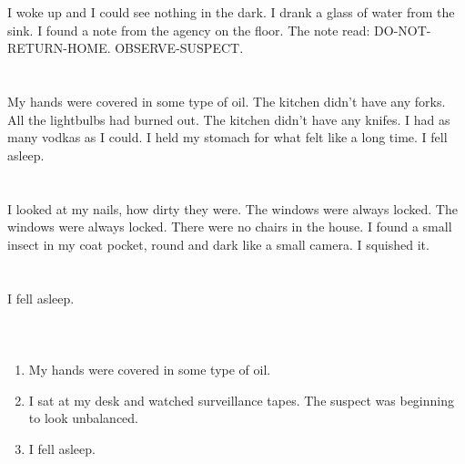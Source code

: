 \documentclass{article}
\begin{document}
    \section{}
    I woke up and I could see nothing in the dark. I drank a glass of water from the sink. I found a note from the agency on the floor. The note read: DO-NOT-RETURN-HOME. OBSERVE-SUSPECT.  
    \newpage
    
    \section{}
    My hands were covered in some type of oil. The kitchen didn't have any forks. All the lightbulbs had burned out. The kitchen didn't have any knifes. I had as many vodkas as I could. I held my stomach for what felt like a long time. I fell asleep.  
    \newpage
    
    \section{}
    I looked at my nails, how dirty they were. The windows were always locked. The windows were always locked. There were no chairs in the house. I found a small insect in my coat pocket, round and dark like a small camera. I squished it.  
    \newpage
    
    \section{}
    I fell asleep.\\\\ 
    \newpage
    
    \section{}
    
    \begin{enumerate}
    
    \item My hands were covered in some type of oil.\\
    
    \item I sat at my desk and watched surveillance tapes. The suspect was beginning to look unbalanced.\\
    
    \item I fell asleep.\\
    
    \end{enumerate}
     
\end{document}
